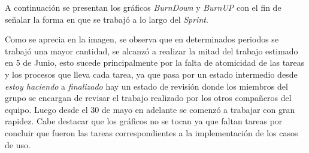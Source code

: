 \documentclass{memoria}
\begin{document}
A continuación se presentan los gráficos \textsl{BurnDown} y \textsl{BurnUP} con el fin de señalar la forma en que se trabajó a lo largo del \textsl{Sprint}.



\newpage
{}

Como se aprecia en la imagen, se observa que en determinados periodos se trabajó una mayor cantidad, se alcanzó a realizar la mitad del trabajo estimado en 5 de Junio, esto sucede principalmente por la falta de atomicidad de las tareas y los procesos que lleva cada tarea, ya que pasa por un estado intermedio desde \textsl{estoy haciendo} a \textsl{finalizado} hay un estado de revisión donde los miembros del grupo se encargan de revisar el trabajo realizado por los otros compañeros del equipo. Luego desde el 30 de mayo en adelante se comenzó a trabajar con gran rapidez. Cabe destacar que los gráficos no se tocan ya que faltan tareas por concluir que fueron las tareas correspondientes a la implementación de los casos de uso.
\end{document}
